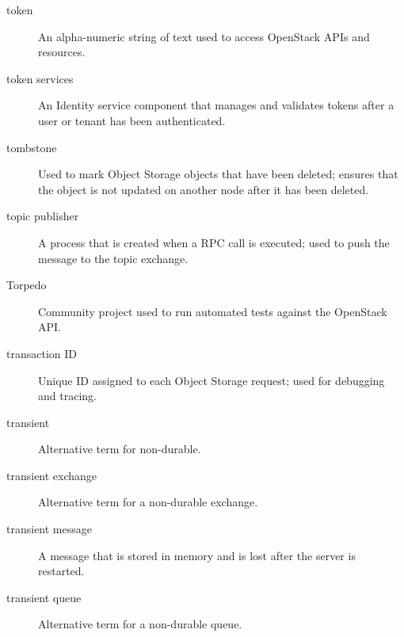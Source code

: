 \documentclass[letterpaper,10pt,english]{sphinxmanual}
\begin{document}
\begin{description}
\item[{token}] \leavevmode{}\label{_source/glossary:term-token}
An alpha-numeric string of text used to access OpenStack APIs
and resources.

\item[{token services}] \leavevmode{}\label{_source/glossary:term-token-services}
An Identity service component that manages and validates tokens
after a user or tenant has been authenticated.

\item[{tombstone}] \leavevmode{}\label{_source/glossary:term-tombstone}
Used to mark Object Storage objects that have been
deleted; ensures that the object is not updated on another node after
it has been deleted.

\item[{topic publisher}] \leavevmode{}\label{_source/glossary:term-topic-publisher}
A process that is created when a RPC call is executed; used to
push the message to the topic exchange.

\item[{Torpedo}] \leavevmode{}\label{_source/glossary:term-torpedo}
Community project used to run automated tests against the
OpenStack API.

\item[{transaction ID}] \leavevmode{}\label{_source/glossary:term-transaction-id}
Unique ID assigned to each Object Storage request; used for
debugging and tracing.

\item[{transient}] \leavevmode{}\label{_source/glossary:term-transient}
Alternative term for non-durable.

\item[{transient exchange}] \leavevmode{}\label{_source/glossary:term-transient-exchange}
Alternative term for a non-durable exchange.

\item[{transient message}] \leavevmode{}\label{_source/glossary:term-transient-message}
A message that is stored in memory and is lost after the server
is restarted.

\item[{transient queue}] \leavevmode{}\label{_source/glossary:term-transient-queue}
Alternative term for a non-durable queue.


\end{description}
\end{document}
